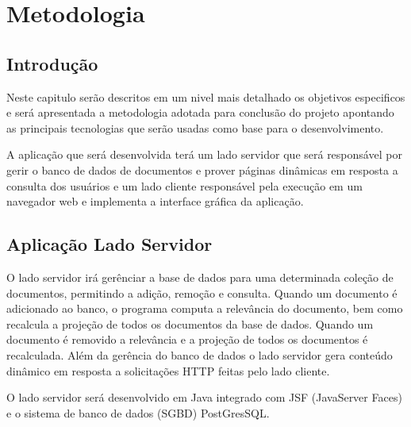 \chapter{Metodologia}
\label{sec-projeto}

\section{Introdução}
\label{Intro-Metodologia}

Neste capitulo serão descritos em um nivel mais detalhado os objetivos especificos e será apresentada a metodologia adotada para conclusão do projeto apontando as principais tecnologias que serão usadas como base para o desenvolvimento.

A aplicação que será desenvolvida terá um lado servidor que será responsável por gerir o banco de dados de documentos e prover páginas dinâmicas em resposta a consulta dos usuários e um lado cliente responsável pela execução em um navegador web e implementa a interface gráfica da aplicação.



\section{Aplicação Lado Servidor}

O lado servidor irá gerênciar a base de dados para uma determinada coleção de documentos, permitindo a adição, remoção e consulta. Quando um documento é adicionado ao banco, o programa computa a relevância do documento, bem como recalcula a projeção de todos os documentos da base de dados. Quando um documento é removido a relevância e a projeção de todos os documentos é recalculada. Além da gerência do banco de dados o lado servidor gera conteúdo dinâmico em resposta a solicitações HTTP feitas pelo lado cliente.

O lado servidor será desenvolvido em Java integrado com JSF (JavaServer Faces) e o sistema de banco de dados (SGBD)  PostGresSQL.


